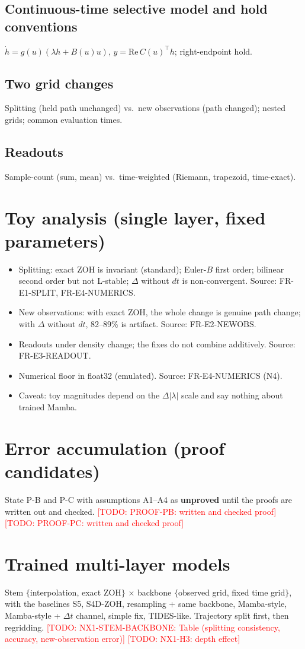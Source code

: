 \documentclass{article}
\newcommand{\todo}[1]{\textcolor{red}{[TODO: #1]}}
\begin{document}
\subsection{Continuous-time selective model and hold conventions}
$\dot h = g(u)(\lambda h + B(u)u)$, $y = \mathrm{Re}\,C(u)^\top h$; right-endpoint hold.
\subsection{Two grid changes}
Splitting (held path unchanged) vs.\ new observations (path changed); nested grids; common evaluation times.
\subsection{Readouts}
Sample-count (sum, mean) vs.\ time-weighted (Riemann, trapezoid, time-exact).

\section{Toy analysis (single layer, fixed parameters)}
\begin{itemize}
  \item Splitting: exact ZOH is invariant (standard); Euler-$B$ first order; bilinear second order but not L-stable; $\Delta$ without $dt$ is non-convergent. Source: FR-E1-SPLIT, FR-E4-NUMERICS.
  \item New observations: with exact ZOH, the whole change is genuine path change; with $\Delta$ without $dt$, 82--89\% is artifact. Source: FR-E2-NEWOBS.
  \item Readouts under density change; the fixes do not combine additively. Source: FR-E3-READOUT.
  \item Numerical floor in float32 (emulated). Source: FR-E4-NUMERICS (N4).
  \item Caveat: toy magnitudes depend on the $\Delta|\lambda|$ scale and say nothing about trained Mamba.
\end{itemize}

\section{Error accumulation (proof candidates)}
State P-B and P-C with assumptions A1--A4 as \textbf{unproved} until the proofs are written out and checked.
\todo{PROOF-PB: written and checked proof} \todo{PROOF-PC: written and checked proof}

\section{Trained multi-layer models}
Stem $\{$interpolation, exact ZOH$\}$ $\times$ backbone $\{$observed grid, fixed time grid$\}$, with the baselines
S5, S4D-ZOH, resampling + same backbone, Mamba-style, Mamba-style + $\Delta t$ channel, simple fix, TIDES-like.
Trajectory split first, then regridding.
\todo{NX1-STEM-BACKBONE: Table (splitting consistency, accuracy, new-observation error)}
\todo{NX1-H3: depth effect}
\end{document}
